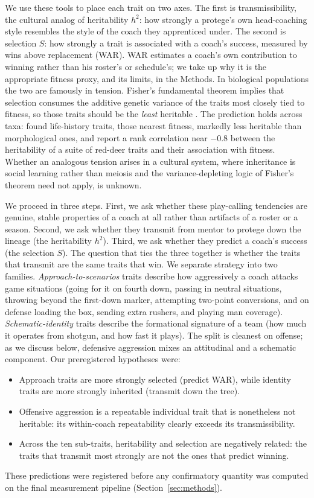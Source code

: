 \documentclass[
  journal=ehs,
  manuscript=article,
  year=2026,
  volume=8,
]{cup-journal}
\begin{document}
We use these tools to place each trait on two axes. The first is transmissibility,
the cultural analog of heritability $h^{2}$: how strongly a protege's own
head-coaching style resembles the style of the coach they apprenticed under. The
second is selection $S$: how strongly a trait is associated with a coach's success,
measured by wins above replacement (WAR). WAR estimates a coach's own contribution to
winning rather than his roster's or schedule's; we take up why it is the appropriate
fitness proxy, and its limits, in the Methods. In biological
populations the two are famously in tension. Fisher's fundamental theorem implies
that selection consumes the additive genetic variance of the traits most closely
tied to fitness, so those traits should be the \emph{least} heritable
\parencite{fisher1930}. The prediction holds across taxa: \textcite{mousseauroff1987}
found life-history traits, those nearest fitness, markedly less heritable than
morphological ones, and \textcite{kruuk2000} report a rank correlation near $-0.8$
between the heritability of a suite of red-deer traits and their association with
fitness. Whether an analogous tension arises in a cultural system, where
inheritance is social learning rather than meiosis and the variance-depleting logic
of Fisher's theorem need not apply, is unknown.

We proceed in three steps. First, we ask whether these play-calling tendencies are
genuine, stable properties of a coach at all rather than artifacts of a roster or a
season. Second, we ask whether they transmit from mentor to protege down the lineage
(the heritability $h^{2}$). Third, we ask whether they predict a coach's success (the
selection $S$). The question that ties the three together is whether the traits that
transmit are the same traits that win. We separate strategy into two
families. \emph{Approach-to-scenarios} traits describe how aggressively a coach
attacks game situations (going for it on fourth down, passing in neutral
situations, throwing beyond the first-down marker, attempting two-point
conversions, and on defense loading the box, sending extra rushers, and playing man
coverage). \emph{Schematic-identity} traits describe the formational signature of a
team (how much it operates from shotgun, and how fast it plays). The split is
cleanest on offense; as we discuss below, defensive aggression mixes an
attitudinal and a schematic component. Our preregistered hypotheses were:
\begin{itemize}
  \item[H1.] Approach traits are more strongly selected (predict WAR), while
  identity traits are more strongly inherited (transmit down the tree).
  \item[H2.] Offensive aggression is a repeatable individual trait that is
  nonetheless not heritable: its within-coach repeatability clearly exceeds its
  transmissibility.
  \item[H3.] Across the ten sub-traits, heritability and selection are negatively
  related: the traits that transmit most strongly are not the ones that predict
  winning.
\end{itemize}
These predictions were registered before any confirmatory quantity was computed on
the final measurement pipeline (Section~\ref{sec:methods}).
\end{document}
